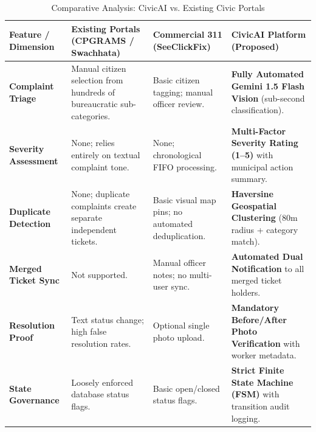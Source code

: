 \documentclass[11pt,a4paper]{article}
\begin{document}
\begin{table}[H]
\centering
\footnotesize
\caption{Comparative Analysis: CivicAI vs. Existing Civic Portals}
\begin{tabularx}{\textwidth}{l X X X}
\toprule
\textbf{Feature / Dimension} & \textbf{Existing Portals (CPGRAMS / Swachhata)} & \textbf{Commercial 311 (SeeClickFix)} & \textbf{CivicAI Platform (Proposed)} \\
\midrule
\textbf{Complaint Triage} & Manual citizen selection from hundreds of bureaucratic sub-categories. & Basic citizen tagging; manual officer review. & \textbf{Fully Automated Gemini 1.5 Flash Vision} (sub-second classification). \\
\textbf{Severity Assessment} & None; relies entirely on textual complaint tone. & None; chronological FIFO processing. & \textbf{Multi-Factor Severity Rating (1--5)} with municipal action summary. \\
\textbf{Duplicate Detection} & None; duplicate complaints create separate independent tickets. & Basic visual map pins; no automated deduplication. & \textbf{Haversine Geospatial Clustering} (80m radius + category match). \\
\textbf{Merged Ticket Sync} & Not supported. & Manual officer notes; no multi-user sync. & \textbf{Automated Dual Notification} to all merged ticket holders. \\
\textbf{Resolution Proof} & Text status change; high false resolution rates. & Optional single photo upload. & \textbf{Mandatory Before/After Photo Verification} with worker metadata. \\
\textbf{State Governance} & Loosely enforced database status flags. & Basic open/closed status flags. & \textbf{Strict Finite State Machine (FSM)} with transition audit logging. \\
\bottomrule
\end{tabularx}
\end{table}
\end{document}
